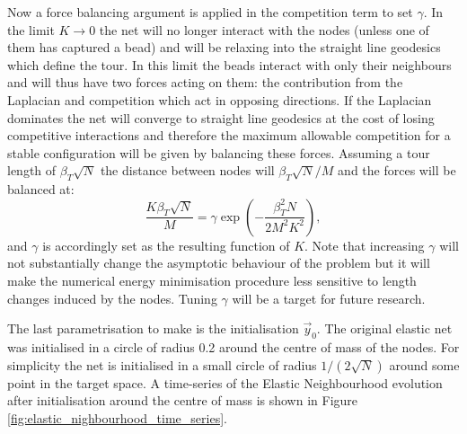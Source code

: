 Now a force balancing argument is applied in the competition term to set $\gamma$. In the limit $K\rightarrow0$ the net will no longer interact with the nodes (unless one of them has captured a bead) and will be relaxing into the straight line geodesics which define the tour. In this limit the beads interact with only their neighbours and will thus have two forces acting on them: the contribution from the Laplacian and competition which act in opposing directions. If the Laplacian dominates the net will converge to straight line geodesics at the cost of losing competitive interactions and therefore the maximum allowable competition for a stable configuration will be given by balancing these forces. Assuming a tour length of $\beta_T\sqrt{N}$ the distance between nodes will $\beta_T\sqrt{N}/M$ and the forces will be balanced at:
\begin{equation}
\frac{K\beta_T \sqrt{N}}{M} = \gamma \exp\left(-\frac{\beta_T^2N}{2 M^2 K^2}\right),
\end{equation}
and $\gamma$ is accordingly set as the resulting function of $K$. Note that increasing $\gamma$ will not substantially change the asymptotic behaviour of the problem but it will make the numerical energy minimisation procedure less sensitive to length changes induced by the nodes. Tuning $\gamma$ will be a target for future research. 

The last parametrisation to make is the initialisation $\vec{y}_0$. The original elastic net was initialised in a circle of radius 0.2 around the centre of mass of the nodes. For simplicity the net is initialised in a small circle of radius $1/(2\sqrt{N})$ around some point in the target space. A time-series of the Elastic Neighbourhood evolution after initialisation around the centre of mass is shown in Figure \ref{fig:elastic_nighbourhood_time_series}.

